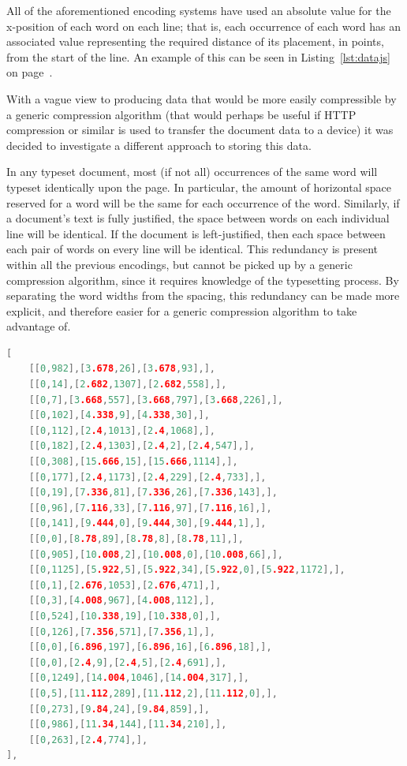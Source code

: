 All of the aforementioned encoding systems have used an absolute value for the x-position of each word on each line; that is, each occurrence of each word has an associated value representing the required distance of its placement, in \glspl{point}, from the start of the line. An example of this can be seen in Listing~\ref{lst:datajs} on page~\pageref{lst:datajs}.

With a vague view to producing data that would be more easily compressible by a generic compression algorithm (that would perhaps be useful if HTTP compression or similar is used to transfer the document data to a device) it was decided to investigate a different approach to storing this data.

In any typeset document, most (if not all) occurrences of the same word will typeset identically upon the page. In particular, the amount of horizontal space reserved for a word will be the same for each occurrence of the word. Similarly, if a document's text is fully justified, the space between words on each individual line will be identical. If the document is left-justified, then each space between each pair of words on every line will be identical. This redundancy is present within all the previous encodings, but cannot be picked up by a generic compression algorithm, since it requires knowledge of the typesetting process. By separating the word widths from the spacing, this redundancy can be made more explicit, and therefore easier for a generic compression algorithm to take advantage of.

\begin{lstlisting}[label=lst:deltasdata,captionpos=b,float,language=c,stringstyle=\color{blue},basicstyle=\ttfamily\footnotesize,caption={[Excerpt from a paragraph tree using deltas]Excerpt from a JavaScript data file that uses position deltas in the Galley Structure Tree, representing one galley rendering of one paragraph. The first value in each pair is the position delta, and the second is the dictionary key of the relevant word.}]
[
    [[0,982],[3.678,26],[3.678,93],],
    [[0,14],[2.682,1307],[2.682,558],],
    [[0,7],[3.668,557],[3.668,797],[3.668,226],],
    [[0,102],[4.338,9],[4.338,30],],
    [[0,112],[2.4,1013],[2.4,1068],],
    [[0,182],[2.4,1303],[2.4,2],[2.4,547],],
    [[0,308],[15.666,15],[15.666,1114],],
    [[0,177],[2.4,1173],[2.4,229],[2.4,733],],
    [[0,19],[7.336,81],[7.336,26],[7.336,143],],
    [[0,96],[7.116,33],[7.116,97],[7.116,16],],
    [[0,141],[9.444,0],[9.444,30],[9.444,1],],
    [[0,0],[8.78,89],[8.78,8],[8.78,11],],
    [[0,905],[10.008,2],[10.008,0],[10.008,66],],
    [[0,1125],[5.922,5],[5.922,34],[5.922,0],[5.922,1172],],
    [[0,1],[2.676,1053],[2.676,471],],
    [[0,3],[4.008,967],[4.008,112],],
    [[0,524],[10.338,19],[10.338,0],],
    [[0,126],[7.356,571],[7.356,1],],
    [[0,0],[6.896,197],[6.896,16],[6.896,18],],
    [[0,0],[2.4,9],[2.4,5],[2.4,691],],
    [[0,1249],[14.004,1046],[14.004,317],],
    [[0,5],[11.112,289],[11.112,2],[11.112,0],],
    [[0,273],[9.84,24],[9.84,859],],
    [[0,986],[11.34,144],[11.34,210],],
    [[0,263],[2.4,774],],
],
\end{lstlisting}


